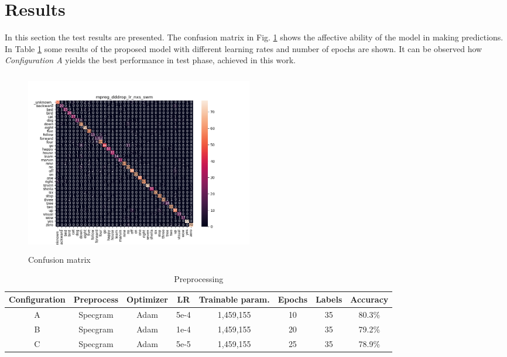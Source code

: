 
\section{Results}
\label{sec:results}
\noindent In this section the test results are presented. The confusion matrix in Fig. \ref{fig:conf_matrix_cnn} shows the affective ability of the model in making predictions. In Table \ref{table:Preprocessing} some results of the proposed model with different learning rates and number of epochs are shown. It can be observed how {\it{Configuration A}} yields the best performance in test phase, achieved in this work.

\begin{figure}[h]
			\centering
	    	\includegraphics[width=10cm, height=8cm]{conf_matrix_cnn_dii_cm}
	    	\caption{Confusion matrix}
	    	\label{fig:conf_matrix_cnn}
\end{figure} 

\begin{table}[ht]
	\centering
	\begin{tabular}{|c c c c c c c c|}
		\hline
		Configuration & Preprocess & Optimizer & LR & Trainable param. & Epochs  & Labels & Accuracy \\
		\hline
		A & Specgram & Adam & 5e-4 & 1,459,155 & 10 & 35 & 80.3\% \\
		B & Specgram & Adam & 1e-4 & 1,459,155 & 20 & 35 & 79.2\% \\
		C & Specgram & Adam & 5e-5 & 1,459,155 & 25 & 35 & 78.9\% \\
		\hline
	\end{tabular}
	\caption{Preprocessing}
	\label{table:Preprocessing}
\end{table}